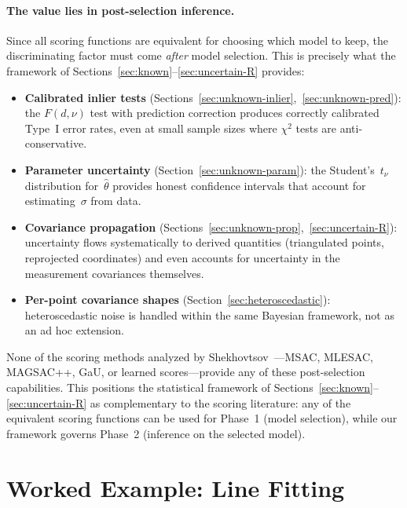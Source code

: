 \documentclass[11pt]{article}
\begin{document}
\paragraph{The value lies in post-selection inference.}
Since all scoring functions are equivalent for choosing which model to
keep, the discriminating factor must come \emph{after} model
selection.  This is precisely what the framework of
Sections~\ref{sec:known}--\ref{sec:uncertain-R} provides:
\begin{itemize}
  \item \textbf{Calibrated inlier tests}
    (Sections~\ref{sec:unknown-inlier},~\ref{sec:unknown-pred}):
    the $F(d,\nu)$ test with prediction correction produces correctly
    calibrated Type~I error rates, even at small sample sizes where
    $\chi^2$ tests are anti-conservative.
  \item \textbf{Parameter uncertainty}
    (Section~\ref{sec:unknown-param}): the Student's~$t_\nu$
    distribution for~$\hat\theta$ provides honest confidence intervals
    that account for estimating~$\sigma$ from data.
  \item \textbf{Covariance propagation}
    (Sections~\ref{sec:unknown-prop},~\ref{sec:uncertain-R}):
    uncertainty flows systematically to derived quantities
    (triangulated points, reprojected coordinates) and even accounts
    for uncertainty in the measurement covariances themselves.
  \item \textbf{Per-point covariance shapes}
    (Section~\ref{sec:heteroscedastic}): heteroscedastic noise is
    handled within the same Bayesian framework, not as an ad hoc
    extension.
\end{itemize}
None of the scoring methods analyzed by
Shekhovtsov~\cite{shekhovtsov2025scoring}---MSAC, MLESAC, MAGSAC++,
GaU, or learned scores---provide any of these post-selection
capabilities.  This positions the statistical framework of
Sections~\ref{sec:known}--\ref{sec:uncertain-R} as complementary to
the scoring literature: any of the equivalent scoring functions can be
used for Phase~1 (model selection), while our framework governs
Phase~2 (inference on the selected model).

\section{Worked Example: Line Fitting}
\label{sec:line}
\end{document}
